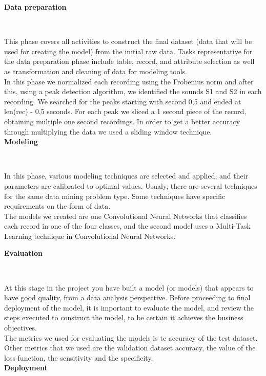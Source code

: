 \documentclass[11pt, a4papper]{report}
\theoremstyle{plain}
\theoremstyle{definition}
\theoremstyle{definition}
\theoremstyle{proposition}
\begin{document}
\textbf{Data preparation}

\

This phase covers all activities to construct the final dataset (data that will be used for creating the model) from the initial raw data. Tasks representative for the data preparation phase include table, record, and attribute selection as well as transformation and cleaning of data for modeling tools.
\\

In this phase we normalized each recording using the Frobenius norm and after this, using a peak detection algorithm, we identified the sounds S1 and S2 in each recording. We searched for the peaks starting with second 0,5 and ended at len(rec) - 0,5 seconds. For each peak we sliced a 1 second piece of the record, obtaining multiple one second recordings. In order to get a better accuracy through multiplying the data we used a sliding window technique.
\\

\textbf{Modeling}

\

In this phase, various modeling techniques are selected and applied, and their parameters are calibrated to optimal values. Usualy, there are several techniques for the same data mining problem type. Some techniques have specific requirements on the form of data.
\\

The models we created are one Convolutional Neural Networks that classifies each record in one of the four classes, and the second model uses a Multi-Task Learning technique in Convolutional Neural Networks.

\textbf{Evaluation}

\

At this stage in the project you have built a model (or models) that appears to have good quality, from a data analysis perspective. Before proceeding to final deployment of the model, it is important to evaluate the model, and review the steps executed to construct the model, to be certain it achieves the business objectives.
\\

The metrics we used for evaluating the models is te accuracy of the test dataset. Other metrics that we used are the validation dataset accuracy, the value of the loss function, the sensitivity and the specificity.
\\

\textbf{Deployment}
\end{document}
